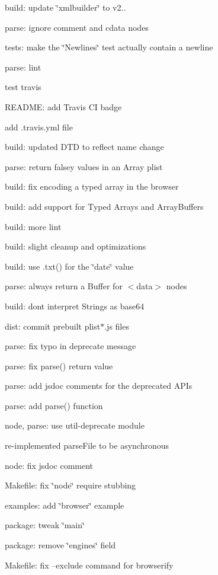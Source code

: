 \begin{DoxyItemize}
\item build\+: update \char`\"{}xmlbuilder\char`\"{} to v2..
\item parse\+: ignore comment and cdata nodes
\item tests\+: make the \char`\"{}\+Newlines\char`\"{} test actually contain a newline
\item parse\+: lint
\item test travis
\item R\+E\+A\+D\+ME\+: add Travis CI badge
\item add .travis.\+yml file
\item build\+: updated D\+TD to reflect name change
\item parse\+: return falsey values in an Array plist
\item build\+: fix encoding a typed array in the browser
\item build\+: add support for Typed Arrays and Array\+Buffers
\item build\+: more lint
\item build\+: slight cleanup and optimizations
\item build\+: use .txt() for the \char`\"{}date\char`\"{} value
\item parse\+: always return a Buffer for $<$data$>$ nodes
\item build\+: don\textquotesingle{}t interpret Strings as base64
\item dist\+: commit prebuilt plist$\ast$.js files
\item parse\+: fix typo in deprecate message
\item parse\+: fix parse() return value
\item parse\+: add jsdoc comments for the deprecated A\+P\+Is
\item parse\+: add {\ttfamily parse()} function
\item node, parse\+: use {\ttfamily util-\/deprecate} module
\item re-\/implemented parse\+File to be asynchronous
\item node\+: fix jsdoc comment
\item Makefile\+: fix \char`\"{}node\char`\"{} require stubbing
\item examples\+: add \char`\"{}browser\char`\"{} example
\item package\+: tweak \char`\"{}main\char`\"{}
\item package\+: remove \char`\"{}engines\char`\"{} field
\item Makefile\+: fix --exclude command for browserify

\end{DoxyItemize}
